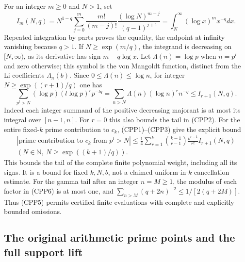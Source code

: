 For an integer $m\ge0$ and $N>1$, set
\begin{equation}\tag{CPP8}
 I_m(N,q)=N^{1-q}\sum_{j=0}^m
       \frac{m!}{(m-j)!}\frac{(\log N)^{m-j}}{(q-1)^{j+1}}
       =\int_N^\infty(\log x)^m x^{-q}dx.
\end{equation}
Repeated integration by parts proves the equality, the endpoint
at infinity vanishing because $q>1$. If
$N\ge\exp(m/q)$, the integrand is decreasing on $[N,\infty)$,
as its derivative has sign $m-q\log x$.
Let $\Lambda(n)=\log p$ when $n=p^l$ and zero otherwise;
this symbol is the von Mangoldt function, distinct from the
Li coefficients $\Lambda_n(b)$. Since $0\le\Lambda(n)\le\log n$,
for integer $N\ge\exp((r+1)/q)$ one has
\begin{equation}\tag{CPP9}
 \sum_{p^l>N}(\log p)(l\log p)^r p^{-lq}
 =\sum_{n>N}\Lambda(n)(\log n)^r n^{-q}
 \le I_{r+1}(N,q).
\end{equation}
Indeed each integer summand of the positive decreasing majorant
is at most its integral over $[n-1,n]$. For $r=0$ this also
bounds the tail in (CPP2). For the entire fixed-$k$ prime
contribution to $c_k$, (CPP1)--(CPP3) give the explicit bound
\begin{equation}\tag{CPP10}\begin{gathered}
 \left|\text{prime contribution to }c_k\text{ from }p^l>N\right|
 \le\frac14\sum_{r=1}^k\binom{k-1}{r-1}
                       \frac{b^{r-1}}{r!}I_{r+1}(N,q)
 \\\left(N\in\mathbb N,\ N\ge\exp((k+1)/q)\right).\end{gathered}
\end{equation}
This bounds the tail of the complete finite polynomial weight,
including all its signs. It is a bound for fixed $k,N,b$,
not a claimed uniform-in-$k$ cancellation estimate. For the
gamma tail after an integer $n=M\ge1$, the modulus of each factor in
(CPP6) is at most one, and
$\sum_{n>M}(q+2n)^{-2}\le1/[2(q+2M)]$.
Thus (CPP5) permits certified finite evaluations with complete
and explicitly bounded omissions.

\subsection{The original arithmetic prime points and the full support lift}

